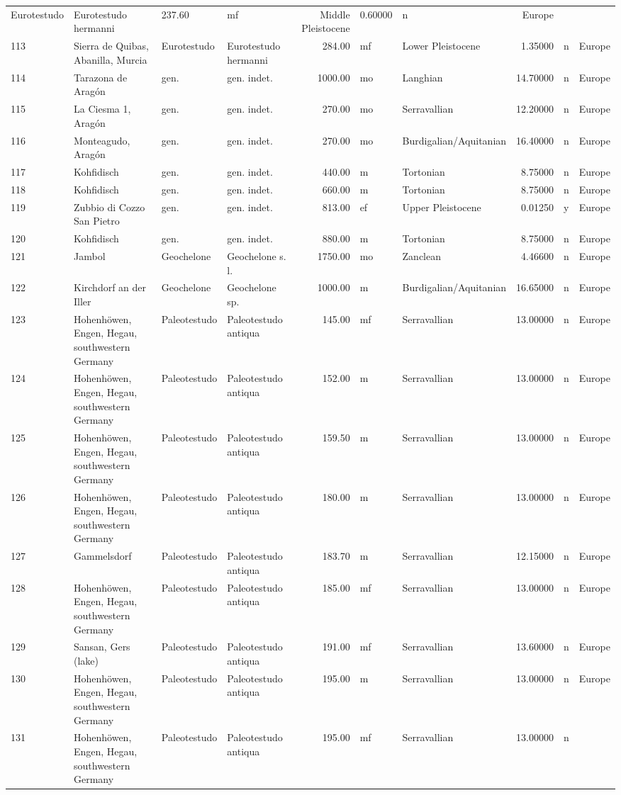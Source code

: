 \documentclass[]{article}
\begin{document}
\begin{longtable}[]{@{}llllrllrll@{}}
Eurotestudo & Eurotestudo hermanni & 237.60 & mf & Middle Pleistocene &
0.60000 & n & Europe\tabularnewline
113 & Sierra de Quibas, Abanilla, Murcia & Eurotestudo & Eurotestudo
hermanni & 284.00 & mf & Lower Pleistocene & 1.35000 & n &
Europe\tabularnewline
114 & Tarazona de Aragón & gen. & gen. indet. & 1000.00 & mo & Langhian
& 14.70000 & n & Europe\tabularnewline
115 & La Ciesma 1, Aragón & gen. & gen. indet. & 270.00 & mo &
Serravallian & 12.20000 & n & Europe\tabularnewline
116 & Monteagudo, Aragón & gen. & gen. indet. & 270.00 & mo &
Burdigalian/Aquitanian & 16.40000 & n & Europe\tabularnewline
117 & Kohfidisch & gen. & gen. indet. & 440.00 & m & Tortonian & 8.75000
& n & Europe\tabularnewline
118 & Kohfidisch & gen. & gen. indet. & 660.00 & m & Tortonian & 8.75000
& n & Europe\tabularnewline
119 & Zubbio di Cozzo San Pietro & gen. & gen. indet. & 813.00 & ef &
Upper Pleistocene & 0.01250 & y & Europe\tabularnewline
120 & Kohfidisch & gen. & gen. indet. & 880.00 & m & Tortonian & 8.75000
& n & Europe\tabularnewline
121 & Jambol & Geochelone & Geochelone s. l. & 1750.00 & mo & Zanclean &
4.46600 & n & Europe\tabularnewline
122 & Kirchdorf an der Iller & Geochelone & Geochelone sp. & 1000.00 & m
& Burdigalian/Aquitanian & 16.65000 & n & Europe\tabularnewline
123 & Hohenhöwen, Engen, Hegau, southwestern Germany & Paleotestudo &
Paleotestudo antiqua & 145.00 & mf & Serravallian & 13.00000 & n &
Europe\tabularnewline
124 & Hohenhöwen, Engen, Hegau, southwestern Germany & Paleotestudo &
Paleotestudo antiqua & 152.00 & m & Serravallian & 13.00000 & n &
Europe\tabularnewline
125 & Hohenhöwen, Engen, Hegau, southwestern Germany & Paleotestudo &
Paleotestudo antiqua & 159.50 & m & Serravallian & 13.00000 & n &
Europe\tabularnewline
126 & Hohenhöwen, Engen, Hegau, southwestern Germany & Paleotestudo &
Paleotestudo antiqua & 180.00 & m & Serravallian & 13.00000 & n &
Europe\tabularnewline
127 & Gammelsdorf & Paleotestudo & Paleotestudo antiqua & 183.70 & m &
Serravallian & 12.15000 & n & Europe\tabularnewline
128 & Hohenhöwen, Engen, Hegau, southwestern Germany & Paleotestudo &
Paleotestudo antiqua & 185.00 & mf & Serravallian & 13.00000 & n &
Europe\tabularnewline
129 & Sansan, Gers (lake) & Paleotestudo & Paleotestudo antiqua & 191.00
& mf & Serravallian & 13.60000 & n & Europe\tabularnewline
130 & Hohenhöwen, Engen, Hegau, southwestern Germany & Paleotestudo &
Paleotestudo antiqua & 195.00 & m & Serravallian & 13.00000 & n &
Europe\tabularnewline
131 & Hohenhöwen, Engen, Hegau, southwestern Germany & Paleotestudo &
Paleotestudo antiqua & 195.00 & mf & Serravallian & 13.00000 & n &

\end{longtable}
\end{document}
